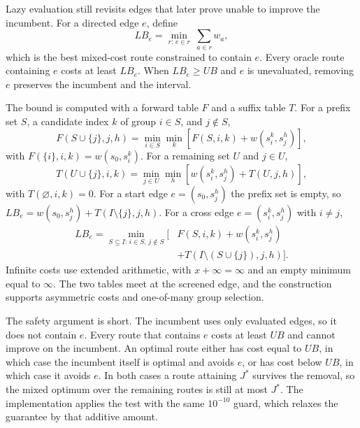 \documentclass[conference]{IEEEtran}
\begin{document}
Lazy evaluation still revisits edges that later prove unable to improve the incumbent. For a directed edge $e$, define
\begin{equation}
LB_e=\min_{r:\,e\in r}\ \sum_{a\in r} w_a,
\end{equation}
which is the best mixed-cost route constrained to contain $e$. Every oracle route containing $e$ costs at least $LB_e$. When $LB_e\ge UB$ and $e$ is unevaluated, removing $e$ preserves the incumbent and the interval.

The bound is computed with a forward table $F$ and a suffix table $T$. For a prefix set $S$, a candidate index $k$ of group $i\in S$, and $j\notin S$,
\begin{equation}
F(S\cup\{j\},j,h)=\min_{i\in S}\min_{k}\left[F(S,i,k)+w(s_i^k,s_j^h)\right],
\end{equation}
with $F(\{i\},i,k)=w(s_0,s_i^k)$. For a remaining set $U$ and $j\in U$,
\begin{equation}
T(U\cup\{j\},i,k)=\min_{j\in U}\min_{h}\left[w(s_i^k,s_j^h)+T(U,j,h)\right],
\end{equation}
with $T(\varnothing,i,k)=0$. For a start edge $e=(s_0,s_j^h)$ the prefix set is empty, so $LB_e=w(s_0,s_j^h)+T(I\setminus\{j\},j,h)$. For a cross edge $e=(s_i^k,s_j^h)$ with $i\neq j$,
\begin{equation}
\begin{split}
LB_e=\min_{S\subseteq I:\,i\in S,\,j\notin S}\big[&F(S,i,k)+w(s_i^k,s_j^h)\\
&+T(I\setminus(S\cup\{j\}),j,h)\big].
\end{split}
\end{equation}
Infinite costs use extended arithmetic, with $x+\infty=\infty$ and an empty minimum equal to $\infty$. The two tables meet at the screened edge, and the construction supports asymmetric costs and one-of-many group selection.

The safety argument is short. The incumbent uses only evaluated edges, so it does not contain $e$. Every route that contains $e$ costs at least $UB$ and cannot improve on the incumbent. An optimal route either has cost equal to $UB$, in which case the incumbent itself is optimal and avoids $e$, or has cost below $UB$, in which case it avoids $e$. In both cases a route attaining $J^\ast$ survives the removal, so the mixed optimum over the remaining routes is still at most $J^\ast$. The implementation applies the test with the same $10^{-10}$ guard, which relaxes the guarantee by that additive amount.
\end{document}
